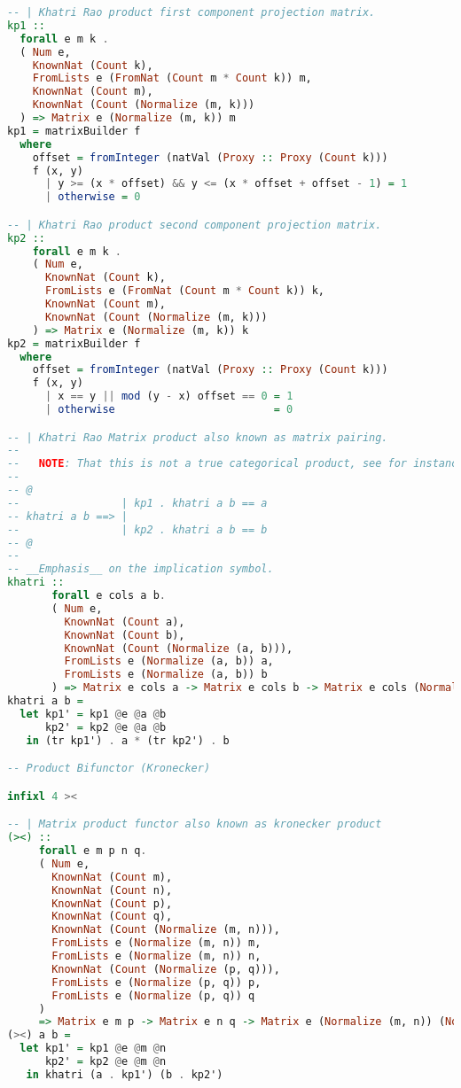 \documentclass[
  oneside,
  11pt, a4paper,
  footinclude=true,
  headinclude=true,
  cleardoublepage=empty
]{scrbook}
\theoremstyle{definition}
\theoremstyle{definition}
\begin{document}
\begin{lstlisting}[language=Haskell, caption={Matrix.Internal},captionpos=b]
-- | Khatri Rao product first component projection matrix.
kp1 :: 
  forall e m k .
  ( Num e,
    KnownNat (Count k),
    FromLists e (FromNat (Count m * Count k)) m,
    KnownNat (Count m),
    KnownNat (Count (Normalize (m, k)))
  ) => Matrix e (Normalize (m, k)) m
kp1 = matrixBuilder f
  where
    offset = fromInteger (natVal (Proxy :: Proxy (Count k)))
    f (x, y)
      | y >= (x * offset) && y <= (x * offset + offset - 1) = 1
      | otherwise = 0

-- | Khatri Rao product second component projection matrix.
kp2 :: 
    forall e m k .
    ( Num e,
      KnownNat (Count k),
      FromLists e (FromNat (Count m * Count k)) k,
      KnownNat (Count m),
      KnownNat (Count (Normalize (m, k)))
    ) => Matrix e (Normalize (m, k)) k
kp2 = matrixBuilder f
  where
    offset = fromInteger (natVal (Proxy :: Proxy (Count k)))
    f (x, y)
      | x == y || mod (y - x) offset == 0 = 1
      | otherwise                         = 0

-- | Khatri Rao Matrix product also known as matrix pairing.
--
--   NOTE: That this is not a true categorical product, see for instance:
-- 
-- @
--                | kp1 . khatri a b == a 
-- khatri a b ==> |
--                | kp2 . khatri a b == b
-- @
--
-- __Emphasis__ on the implication symbol.
khatri :: 
       forall e cols a b. 
       ( Num e,
         KnownNat (Count a),
         KnownNat (Count b),
         KnownNat (Count (Normalize (a, b))),
         FromLists e (Normalize (a, b)) a,
         FromLists e (Normalize (a, b)) b
       ) => Matrix e cols a -> Matrix e cols b -> Matrix e cols (Normalize (a, b))
khatri a b =
  let kp1' = kp1 @e @a @b
      kp2' = kp2 @e @a @b
   in (tr kp1') . a * (tr kp2') . b

-- Product Bifunctor (Kronecker)

infixl 4 ><

-- | Matrix product functor also known as kronecker product
(><) :: 
     forall e m p n q. 
     ( Num e,
       KnownNat (Count m),
       KnownNat (Count n),
       KnownNat (Count p),
       KnownNat (Count q),
       KnownNat (Count (Normalize (m, n))),
       FromLists e (Normalize (m, n)) m,
       FromLists e (Normalize (m, n)) n,
       KnownNat (Count (Normalize (p, q))),
       FromLists e (Normalize (p, q)) p,
       FromLists e (Normalize (p, q)) q
     ) 
     => Matrix e m p -> Matrix e n q -> Matrix e (Normalize (m, n)) (Normalize (p, q))
(><) a b =
  let kp1' = kp1 @e @m @n
      kp2' = kp2 @e @m @n
   in khatri (a . kp1') (b . kp2')


\end{lstlisting}
\end{document}
